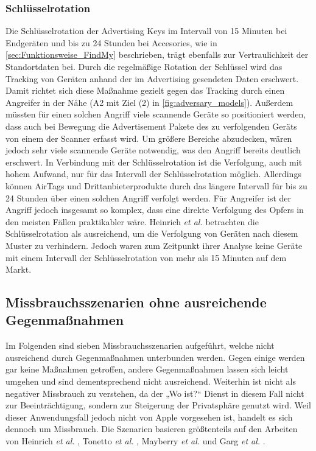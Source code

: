 \subsubsection{Schlüsselrotation}
Die Schlüsselrotation der Advertising Keys im Intervall von 15 Minuten bei Endgeräten und bis zu 24 Stunden bei Accesories, wie in \autoref{sec:Funktionsweise_FindMy} beschrieben, trägt ebenfalls zur Vertraulichkeit der Standortdaten bei.
Durch die regelmäßige Rotation der Schlüssel wird das Tracking von Geräten anhand der im Advertising gesendeten Daten erschwert.
Damit richtet sich diese Maßnahme gezielt gegen das Tracking durch einen Angreifer in der Nähe (A2 mit Ziel (2) in \autoref{fig:adversary_models}).
Außerdem müssten für einen solchen Angriff viele scannende Geräte so positioniert werden, dass auch bei Bewegung die Advertisement Pakete des zu verfolgenden Geräts von einem der Scanner erfasst wird.
Um größere Bereiche abzudecken, wären jedoch sehr viele scannende Geräte notwendig, was den Angriff bereits deutlich erschwert.
In Verbindung mit der Schlüsselrotation ist die Verfolgung, auch mit hohem Aufwand, nur für das Intervall der Schlüsselrotation möglich.
Allerdings können AirTags und Drittanbieterprodukte durch das längere Intervall für bis zu 24 Stunden über einen solchen Angriff verfolgt werden.
Für Angreifer ist der Angriff jedoch insgesamt so komplex, dass eine direkte Verfolgung des Opfers in den meisten Fällen praktikabler wäre.
Heinrich \textit{et al.} \cite{Heinrich_FindMy} betrachten die Schlüsselrotation als ausreichend, um die Verfolgung von Geräten nach diesem Muster zu verhindern.
Jedoch waren zum Zeitpunkt ihrer Analyse keine Geräte mit einem Intervall der Schlüsselrotation von mehr als 15 Minuten auf dem Markt.


\subsection{Missbrauchsszenarien ohne ausreichende Gegenmaßnahmen}
\label{sec:szenarien}

Im Folgenden sind sieben Missbrauchsszenarien aufgeführt, welche nicht ausreichend durch Gegenmaßnahmen unterbunden werden.
Gegen einige werden gar keine Maßnahmen getroffen, andere Gegenmaßnahmen lassen sich leicht umgehen und sind dementsprechend nicht ausreichend.
Weiterhin ist  nicht als negativer Missbrauch zu verstehen, da der „Wo ist?“ Dienst in diesem Fall nicht zur Beeinträchtigung, sondern zur Steigerung der Privatsphäre genutzt wird.
Weil dieser Anwendungsfall jedoch nicht von Apple vorgesehen ist, handelt es sich dennoch um Missbrauch.
Die Szenarien basieren größtenteils auf den Arbeiten von Heinrich \textit{et al.} \cite{Heinrich_FindMy}, Tonetto \textit{et al.} \cite{Tonetto_FindMy}, Mayberry \textit{et al.} \cite{Mayberry_Tracking} und Garg \textit{et al.} \cite{Garg_Secure_Tracker}.

